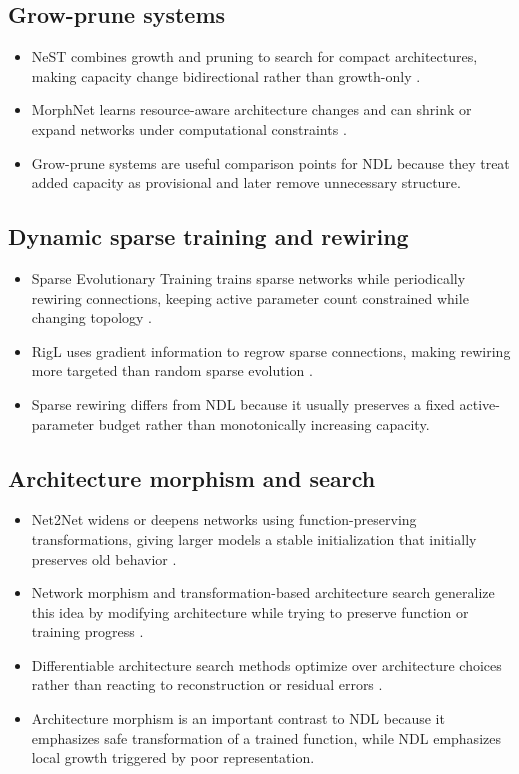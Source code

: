 \subsection{Grow-prune systems}
\begin{itemize}
  \item NeST combines growth and pruning to search for compact architectures, making capacity change bidirectional rather than growth-only \parencite{dai2018nest}.
  \item MorphNet learns resource-aware architecture changes and can shrink or expand networks under computational constraints \parencite{gordon2018morphnet}.
  \item Grow-prune systems are useful comparison points for NDL because they treat added capacity as provisional and later remove unnecessary structure.
\end{itemize}

\subsection{Dynamic sparse training and rewiring}
\begin{itemize}
  \item Sparse Evolutionary Training trains sparse networks while periodically rewiring connections, keeping active parameter count constrained while changing topology \parencite{mocanu2018scalable}.
  \item RigL uses gradient information to regrow sparse connections, making rewiring more targeted than random sparse evolution \parencite{evci2020rigging}.
  \item Sparse rewiring differs from NDL because it usually preserves a fixed active-parameter budget rather than monotonically increasing capacity.
\end{itemize}

\subsection{Architecture morphism and search}
\begin{itemize}
  \item Net2Net widens or deepens networks using function-preserving transformations, giving larger models a stable initialization that initially preserves old behavior \parencite{chen2016net2net}.
  \item Network morphism and transformation-based architecture search generalize this idea by modifying architecture while trying to preserve function or training progress \parencite{wei2016network}.
  \item Differentiable architecture search methods optimize over architecture choices rather than reacting to reconstruction or residual errors \parencite{liu2019darts}.
  \item Architecture morphism is an important contrast to NDL because it emphasizes safe transformation of a trained function, while NDL emphasizes local growth triggered by poor representation.
\end{itemize}


